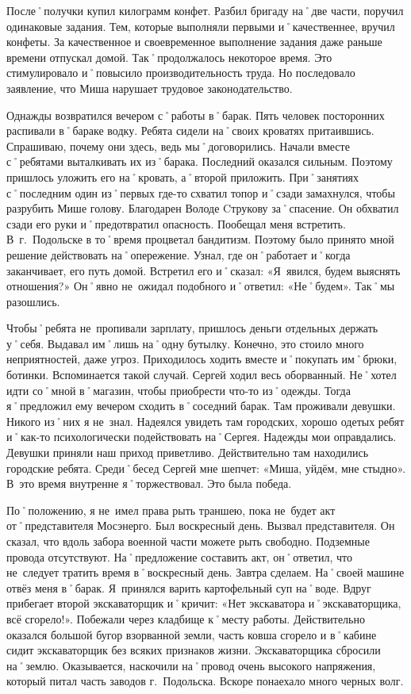 После˚получки купил килограмм конфет. Разбил бригаду на˚две части, поручил одинаковые задания. Тем, которые выполняли первыми и˚качественнее, вручил конфеты. За качественное и своевременное выполнение задания даже раньше времени отпускал домой. Так˚продолжалось некоторое время. Это стимулировало и˚повысило производительность труда. Но последовало заявление, что Миша нарушает трудовое законодательство.

Однажды возвратился вечером с˚работы в˚барак. Пять человек посторонних распивали в˚бараке водку. Ребята сидели на˚своих кроватях притаившись. Спрашиваю, почему они здесь, ведь мы˚договорились. Начали вместе с˚ребятами выталкивать их из˚барака. Последний оказался сильным. Поэтому пришлось уложить его на˚кровать, а˚второй приложить. При˚занятиях с˚последним один из˚первых где-то схватил топор и˚сзади замахнулся, чтобы разрубить Мише голову. Благодарен Володе Cтрукову за˚спасение. Он обхватил сзади его руки и˚предотвратил опасность. Пообещал меня встретить. В~г.~Подольске в то˚время процветал бандитизм. Поэтому было принято мной решение действовать на˚опережение. Узнал, где он˚работает и˚когда заканчивает, его путь домой. Встретил его и˚сказал: «Я~явился, будем выяснять отношения?» Он˚явно не~ожидал подобного и˚ответил: «Не˚будем». Так˚мы разошлись.

Чтобы˚ребята не~пропивали зарплату, пришлось деньги отдельных держать у˚себя. Выдавал им˚лишь на˚одну бутылку. Конечно, это стоило много неприятностей, даже угроз. Приходилось ходить вместе и˚покупать им˚брюки, ботинки. Вспоминается такой случай. Сергей ходил весь оборванный. Не˚хотел идти со˚мной в˚магазин, чтобы приобрести что-то из˚одежды. Тогда я˚предложил ему вечером сходить в˚соседний барак. Там проживали девушки. Никого из˚них я не~знал. Надеялся увидеть там городских, хорошо одетых ребят и˚как-то психологически подействовать на˚Сергея. Надежды мои оправдались. Девушки приняли наш приход приветливо. Действительно там находились городские ребята. Среди˚бесед Сергей мне шепчет: «Миша, уйдём, мне стыдно». В~это время внутренне я˚торжествовал. Это была победа.

По˚положению, я не~имел права рыть траншею, пока не~будет акт от˚представителя Мосэнерго. Был воскресный день. Вызвал представителя. Он сказал, что вдоль забора военной части можете рыть свободно. Подземные провода отсутствуют. На˚предложение составить акт, он˚ответил, что не~следует тратить время в˚воскресный день. Завтра сделаем. На˚своей машине отвёз меня в˚барак. Я~принялся варить картофельный суп на˚воде. Вдруг прибегает второй экскаваторщик и˚кричит: «Нет экскаватора и˚экскаваторщика, всё сгорело!». Побежали через кладбище к˚месту работы. Действительно оказался большой бугор взорванной земли, часть ковша сгорело и в˚кабине сидит экскаваторщик без всяких признаков жизни. Экскаваторщика сбросили на˚землю. Оказывается, наскочили на˚провод очень высокого напряжения, который питал часть заводов г.~Подольска. Вскоре понаехало много черных волг. 

